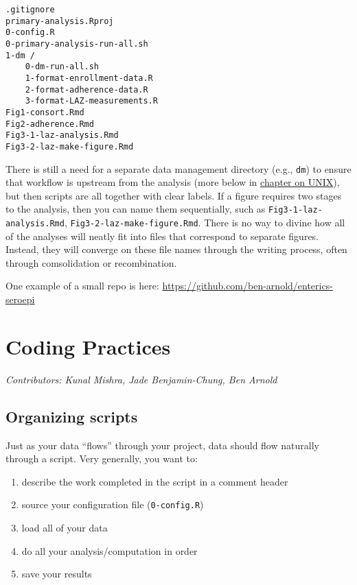 \documentclass[]{book}
\providecommand{\tightlist}{%
  \setlength{\itemsep}{0pt}\setlength{\parskip}{0pt}}
\begin{document}
\begin{verbatim}
.gitignore
primary-analysis.Rproj
0-config.R
0-primary-analysis-run-all.sh
1-dm /
    0-dm-run-all.sh
    1-format-enrollment-data.R
    2-format-adherence-data.R
    3-format-LAZ-measurements.R
Fig1-consort.Rmd
Fig2-adherence.Rmd
Fig3-1-laz-analysis.Rmd
Fig3-2-laz-make-figure.Rmd
\end{verbatim}

There is still a need for a separate data management directory (e.g., \texttt{dm}) to ensure that workflow is upstream from the analysis (more below in \protect\hyperlink{unix}{chapter on UNIX}), but then scripts are all together with clear labels. If a figure requires two stages to the analysis, then you can name them sequentially, such as \texttt{Fig3-1-laz-analysis.Rmd}, \texttt{Fig3-2-laz-make-figure.Rmd}. There is no way to divine how all of the analyses will neatly fit into files that correspond to separate figures. Instead, they will converge on these file names through the writing process, often through comsolidation or recombination.

One example of a small repo is here:
\url{https://github.com/ben-arnold/enterics-seroepi}

\hypertarget{codingpractices}{%
\chapter{Coding Practices}\label{codingpractices}}

\emph{Contributors: Kunal Mishra, Jade Benjamin-Chung, Ben Arnold}

\hypertarget{organizing-scripts}{%
\section{Organizing scripts}\label{organizing-scripts}}

Just as your data ``flows'' through your project, data should flow naturally through a script. Very generally, you want to:

\begin{enumerate}
\def\labelenumi{\arabic{enumi}.}
\tightlist
\item
  describe the work completed in the script in a comment header
\item
  source your configuration file (\texttt{0-config.R})
\item
  load all of your data
\item
  do all your analysis/computation in order
\item
  save your results
\end{enumerate}
\end{document}
